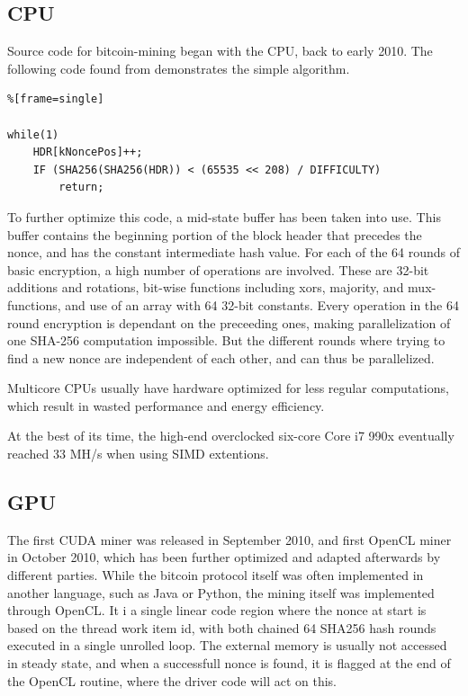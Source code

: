 
\subsection{CPU}
Source code for bitcoin-mining began with the CPU, back to early 2010. 
The following code found from \cite{bitcoin github} demonstrates the simple algorithm.      
       
\begin{lstlisting}%[frame=single]  

while(1)
    HDR[kNoncePos]++;
    IF (SHA256(SHA256(HDR)) < (65535 << 208) / DIFFICULTY)
        return;
\end{lstlisting}

To further optimize this code, a mid-state buffer has been taken into use.
This buffer contains the beginning portion of the block header that precedes the nonce, and has the constant intermediate hash value.
For each of the 64 rounds of basic encryption, a high number of operations are involved.
These are 32-bit additions and rotations, bit-wise functions including xors, majority, and mux-functions, and use of an array with 64 32-bit constants.
Every operation in the 64 round encryption is dependant on the preceeding ones, making parallelization of one SHA-256 computation impossible.
But the different rounds where trying to find a new nonce are independent of each other, and can thus be parallelized.

Multicore CPUs usually have hardware optimized for less regular computations, which result in wasted performance and energy efficiency. \cite{bespoke-silicon}

At the best of its time, the high-end overclocked six-core Core i7 990x eventually reached 33 MH/s when using SIMD extentions.

\subsection{GPU}
The first CUDA miner was released in September 2010, and first OpenCL miner in October 2010, which has been further optimized and adapted afterwards by different parties.
While the bitcoin protocol itself was often implemented in another language, such as Java or Python, the mining itself was implemented through OpenCL.
It i a single linear code region where the nonce at start is based on the thread work item id, with both chained 64 SHA256 hash rounds executed in a single unrolled loop.
The external memory is usually not accessed in steady state, and when a successfull nonce is found, it is flagged at the end of the OpenCL routine, where the driver code will act on this. 

